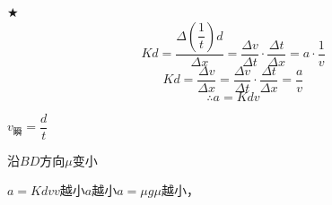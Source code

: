 
$\bigstar$ %
\[ Kd=\frac{\Delta\!\left(\dfrac{1}{t}\right)d}{\Delta x}=\frac{\Delta v}{\Delta t}\cdot\frac{\Delta t}{\Delta x}=a\cdot\frac{1}{v} \]
\[ Kd=\frac{\Delta v}{\Delta x}=\frac{\Delta v}{\Delta t}\cdot\frac{\Delta t}{\Delta x}=\frac{a}{v} \]
\[ \therefore a=Kdv \]


$v_{\text{瞬}}=\dfrac{d}{t}$

沿$BD$方向$\mu$变小

$a=Kdv$\quad $v$越小$a$越小\quad $a=\mu g$\quad $\mu$越小，

